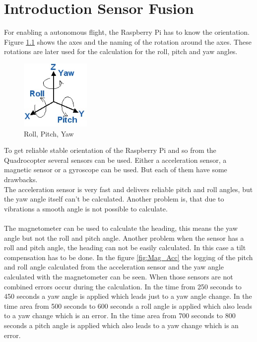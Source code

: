 \chapter{Introduction Sensor Fusion}
\label{chap:Intro}

For enabling a autonomous flight, the Raspberry Pi has to know the orientation. Figure \ref{fig:angles} shows the axes and the naming of the rotation around the axes. These rotations are later used for the calculation for the roll, pitch and yaw angles.

\begin{figure}[H]
	\centering\includegraphics[width=0.3\textwidth]{fig/Roll_pitch_yaw}
	\caption{Roll, Pitch, Yaw \cite{doc:boreg}}
	\label{fig:angles}
\end{figure}

To get reliable stable orientation of the Raspberry Pi and so from the Quadrocopter several sensors can be used. Either a acceleration sensor, a magnetic sensor or a gyroscope can be used. But each of them have some drawbacks.\\
The acceleration sensor is very fast and delivers reliable pitch and roll angles, but the yaw angle itself can't be calculated. Another problem is, that due to vibrations a smooth angle is not possible to calculate.\\\\
The magnetometer can be used to calculate the heading, this means the yaw angle but not the roll and pitch angle. Another problem when the sensor has a roll and pitch angle, the heading can not be easily calculated. In this case a tilt compensation has to be done. In the figure \ref{fig:Mag_Acc} the logging of the pitch and roll angle calculated from the acceleration sensor and the yaw angle calculated with the magnetometer can be seen. When those sensors are not combined errors occur during the calculation. In the time from 250 seconds to 450 seconds a yaw angle is applied which leads just to a yaw angle change. In the time area from 500 seconds to 600 seconds a roll angle is applied which also leads to a yaw change which is an error. In the time area from 700 seconds to 800 seconds a pitch angle is applied which also leads to a yaw change which is an error.\\


